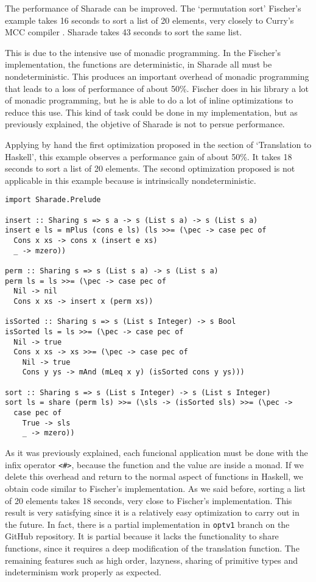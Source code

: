 \documentclass[class=article, crop=false]{standalone}
\begin{document}
The performance of Sharade can be improved. The `permutation sort' Fischer's example takes
16 seconds to sort a list of 20 elements, very closely to Curry's MCC
compiler \cite{lux2003munster}. Sharade takes 43 seconds to sort the same list.

This is due to the intensive use of monadic programming. In the Fischer's implementation, the
functions are deterministic, in Sharade all must be nondeterministic. This produces an
important overhead of monadic programming that leads to a loss of performance of about 50\%.
Fischer does in his library a lot of monadic programming, but he is able to do a lot of
inline optimizations to reduce this use. This kind of task could be done in my
implementation, but as previously explained, the objetive of Sharade is not to persue
performance.

Applying by hand the first optimization proposed in the section of `Translation to Haskell',
this example observes a performance gain of about 50\%. It takes 18 seconds to sort a list of
20 elements. The second optimization proposed is not applicable in this example because is
intrinsically nondeterministic.

\begin{verbatim}
import Sharade.Prelude

insert :: Sharing s => s a -> s (List s a) -> s (List s a)
insert e ls = mPlus (cons e ls) (ls >>= (\pec -> case pec of
  Cons x xs -> cons x (insert e xs)
  _ -> mzero))

perm :: Sharing s => s (List s a) -> s (List s a)
perm ls = ls >>= (\pec -> case pec of
  Nil -> nil
  Cons x xs -> insert x (perm xs))

isSorted :: Sharing s => s (List s Integer) -> s Bool
isSorted ls = ls >>= (\pec -> case pec of
  Nil -> true
  Cons x xs -> xs >>= (\pec -> case pec of
    Nil -> true
    Cons y ys -> mAnd (mLeq x y) (isSorted cons y ys)))

sort :: Sharing s => s (List s Integer) -> s (List s Integer)
sort ls = share (perm ls) >>= (\sls -> (isSorted sls) >>= (\pec ->
  case pec of
    True -> sls
    _ -> mzero))
\end{verbatim}

As it was previously explained, each funcional application must be done with the infix
operator \verb`<#>`, because the function and the value are inside a monad. If we delete this
overhead and return to the normal aspect of functions in Haskell, we obtain code similar to
Fischer's implementation. As we said before, sorting a list of 20 elements takes
18 seconds, very close to Fischer's implementation. This result is very satisfying since it
is a relatively easy optimization to carry out in the future. In fact, there is a partial
implementation in \verb`optv1` branch on the GitHub repository. It is partial because it
lacks the functionality to share functions, since it requires a deep modification of the
translation function. The remaining features such as high order, lazyness, sharing of
primitive types and indeterminism work properly as expected.
\end{document}
